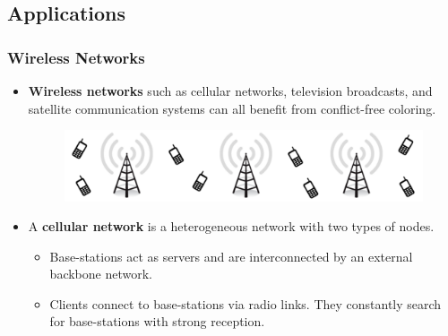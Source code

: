 \documentclass[xcolor=dvipsnames,aspectratio=1610]{beamer}
\begin{document}

  \subsection{Applications}


  \begin{frame}
    \frametitle{Wireless Networks}

    \begin{itemize}
      \item \textbf{Wireless networks} such as cellular networks, television broadcasts, and satellite communication systems can all benefit from conflict-free coloring.

      \begin{figure}[h]
        \centering
        \includegraphics[width=12cm]{../figures/towers-slides.pdf}
      \end{figure}

      \pause

      \item A \textbf{cellular network} is a heterogeneous network with two types of nodes.

      \pause

      \begin{itemize}
        \item Base-stations act as servers and are interconnected by an external backbone network.
        \pause
        \item Clients connect to base-stations via radio links. They constantly search for base-stations with strong reception.
      \end{itemize}
    \end{itemize}

  \end{frame}
\end{document}
